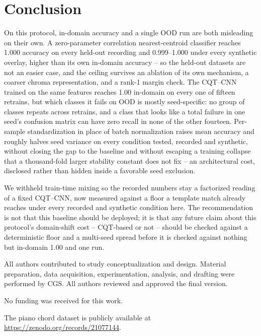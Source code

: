 \documentclass[pdflatex,sn-mathphys-num,iicol]{sn-jnl}
\theoremstyle{thmstyleone}
\theoremstyle{thmstyletwo}
\theoremstyle{thmstylethree}
\begin{document}
\section{Conclusion}\label{sec6}

On this protocol, in-domain accuracy and a single OOD run are both misleading on their own. A zero-parameter correlation nearest-centroid classifier reaches 1.000 accuracy on every held-out recording and 0.999--1.000 under every synthetic overlay, higher than its own in-domain accuracy -- so the held-out datasets are not an easier case, and the ceiling survives an ablation of its own mechanism, a coarser chroma representation, and a rank-1 margin check. The CQT--CNN trained on the same features reaches 1.00 in-domain on every one of fifteen retrains, but which classes it fails on OOD is mostly seed-specific: no group of classes repeats across retrains, and a class that looks like a total failure in one seed's confusion matrix can have zero recall in none of the other fourteen. Per-sample standardization in place of batch normalization raises mean accuracy and roughly halves seed variance on every condition tested, recorded and synthetic, without closing the gap to the baseline and without escaping a training collapse that a thousand-fold larger stability constant does not fix -- an architectural cost, disclosed rather than hidden inside a favorable seed exclusion.

We withheld train-time mixing so the recorded numbers stay a factorized reading of a fixed CQT--CNN, now measured against a floor a template match already reaches under every recorded and synthetic condition here. The recommendation is not that this baseline should be deployed; it is that any future claim about this protocol's domain-shift cost -- CQT-based or not -- should be checked against a deterministic floor and a multi-seed spread before it is checked against nothing but in-domain 1.00 and one run.

\backmatter

All authors contributed to study conceptualization and design. Material preparation, data acquisition, experimentation, analysis, and drafting were performed by CGS. All authors reviewed and approved the final version.

No funding was received for this work.

The piano chord dataset is publicly available at \url{https://zenodo.org/records/21077144}.
\end{document}

